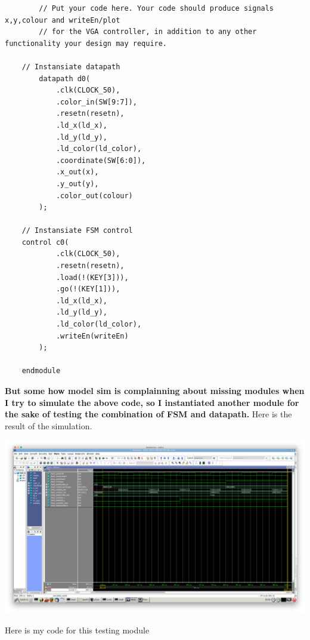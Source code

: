 \documentclass{article}
\begin{document}
\begin{verbatim}
        // Put your code here. Your code should produce signals x,y,colour and writeEn/plot
        // for the VGA controller, in addition to any other functionality your design may require.
        
    // Instansiate datapath
        datapath d0(
            .clk(CLOCK_50),
            .color_in(SW[9:7]),
            .resetn(resetn),
            .ld_x(ld_x),
            .ld_y(ld_y),
            .ld_color(ld_color),
            .coordinate(SW[6:0]),
            .x_out(x),
            .y_out(y),
            .color_out(colour)
        );
        
    // Instansiate FSM control
    control c0(
            .clk(CLOCK_50),
            .resetn(resetn),
            .load(!(KEY[3])),
            .go(!(KEY[1])),
            .ld_x(ld_x),
            .ld_y(ld_y),
            .ld_color(ld_color),
            .writeEn(writeEn)	
        );

    endmodule

\end{verbatim}
\textbf{But some how model sim is complainning about missing modules when I try to simulate the above code, so I instantiated another module for the sake of testing the combination of FSM and datapath.} Here is the result of the simulation. 

\begin{center}
    \includegraphics[scale=0.23]{part2_modelsim_test_comb.png}
\end{center}

Here is my code for this testing module
\end{document}
